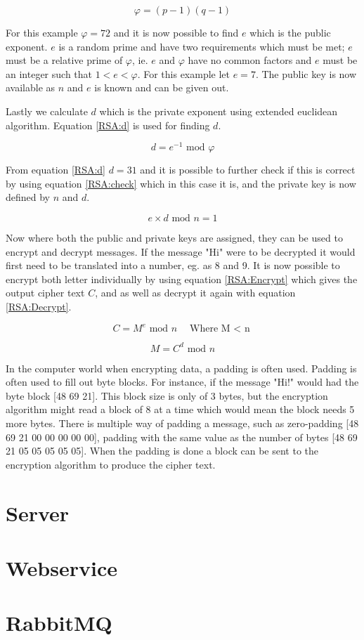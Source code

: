 \begin{equation}
\varphi = (p-1)(q-1)
\label{RSA:phi}
\end{equation}

For this example $\varphi = 72$ and it is now possible to find $e$ which is the public exponent. $e$ is a random prime and have two requirements which must be met; $e$ must be a relative prime of $\varphi$, ie. $e$ and $\varphi$ have no common factors and $e$ must be an integer such that $1 < e < \varphi$. For this example let $e=7$. The public key is now available as $n$ and $e$ is known and can be given out.

Lastly we calculate $d$ which is the private exponent using extended euclidean algorithm. Equation \ref{RSA:d} is used for finding $d$.

\begin{equation}
d = e^{-1} \textrm{ mod } \varphi
\label{RSA:d}
\end{equation}

From equation \ref{RSA:d} $d=31$ and it is possible to further check if this is correct by using equation \ref{RSA:check} which in this case it is, and the private key is now defined by $n$ and $d$.

\begin{equation}
e \times d \textrm{ mod } n = 1
\label{RSA:check}
\end{equation}

Now where both the public and private keys are assigned, they can be used to encrypt and decrypt messages. If the message "Hi" were to be decrypted it would first need to be translated into a number, eg. as 8 and 9. It is now possible to encrypt both letter individually by using equation \ref{RSA:Encrypt} which gives the output cipher text $C$, and as well as decrypt it again with equation \ref{RSA:Decrypt}.

\begin{equation}
C=M^e \textrm{ mod } n \quad \textrm{Where M $<$ n}
\label{RSA:Encrypt}
\end{equation}

\begin{equation}
M=C^d \textrm{ mod } n
\label{RSA:Decrypt}
\end{equation}

In the computer world when encrypting data, a padding is often used. Padding is often used to fill out byte blocks. For instance, if the message "Hi!" would had the byte block [48 69 21]. This block size is only of 3 bytes, but the encryption algorithm might read a block of 8 at a time which would mean the block needs 5 more bytes. There is multiple way of padding a message, such as zero-padding [48 69 21 00 00 00 00 00], padding with the same value as the number of bytes [48 69 21 05 05 05 05 05]\cite{PADDING}. When the padding is done a block can be sent to the encryption algorithm to produce the cipher text.

\section{Server}

\section{Webservice}

\section{RabbitMQ}